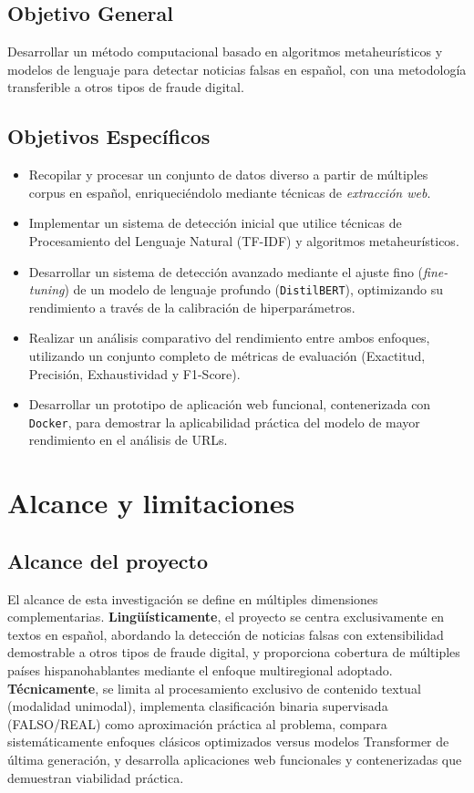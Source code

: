 \subsection*{Objetivo General}
Desarrollar un método computacional basado en algoritmos metaheurísticos y modelos de lenguaje para detectar noticias falsas en español, con una metodología transferible a otros tipos de fraude digital.

\subsection*{Objetivos Específicos}

\begin{itemize}
    \item Recopilar y procesar un conjunto de datos diverso a partir de múltiples corpus en español, enriqueciéndolo mediante técnicas de \textit{extracción web}.
    \item Implementar un sistema de detección inicial que utilice técnicas de Procesamiento del Lenguaje Natural (TF-IDF) y algoritmos metaheurísticos.
    \item Desarrollar un sistema de detección avanzado mediante el ajuste fino (\textit{fine-tuning}) de un modelo de lenguaje profundo (\texttt{DistilBERT}), optimizando su rendimiento a través de la calibración de hiperparámetros.
    \item Realizar un análisis comparativo del rendimiento entre ambos enfoques, utilizando un conjunto completo de métricas de evaluación (Exactitud, Precisión, Exhaustividad y F1-Score).
    \item Desarrollar un prototipo de aplicación web funcional, contenerizada con \texttt{Docker}, para demostrar la aplicabilidad práctica del modelo de mayor rendimiento en el análisis de URLs.
\end{itemize}

\section{Alcance y limitaciones}

\subsection{Alcance del proyecto}

El alcance de esta investigación se define en múltiples dimensiones complementarias. \textbf{Lingüísticamente}, el proyecto se centra exclusivamente en textos en español, abordando la detección de noticias falsas con extensibilidad demostrable a otros tipos de fraude digital, y proporciona cobertura de múltiples países hispanohablantes mediante el enfoque multiregional adoptado. \textbf{Técnicamente}, se limita al procesamiento exclusivo de contenido textual (modalidad unimodal), implementa clasificación binaria supervisada (FALSO/REAL) como aproximación práctica al problema, compara sistemáticamente enfoques clásicos optimizados versus modelos Transformer de última generación, y desarrolla aplicaciones web funcionales y contenerizadas que demuestran viabilidad práctica.

